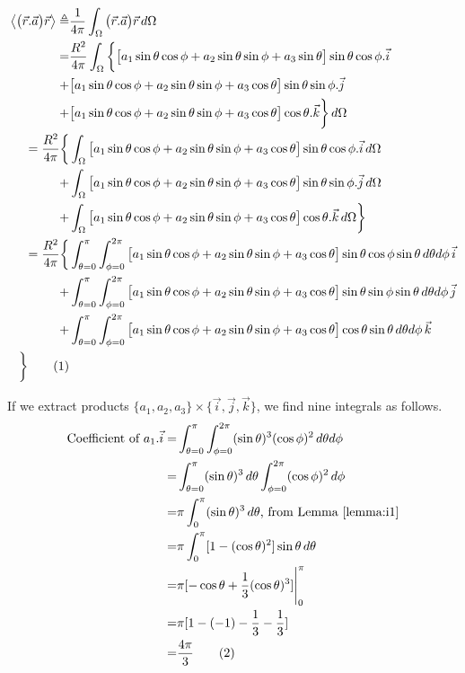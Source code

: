 \documentclass[]{article}
\newcommand\numberthis{\addtocounter{equation}{1}\tag{\theequation}}
\begin{document}
\begin{align*}
\left\langle \big(\vec{r}.\vec{a}\big)\vec{r} \right\rangle \triangleq& \frac{1}{4\pi}\int_{\Omega}\big(\vec{r}.\vec{a}\big)\vec{r} \, d\Omega \\
=&  \frac{ R^2}{4\pi}\int_{\Omega} \bigg\{ \big[a_1\sin\theta\cos\phi + a_2\sin\theta\sin\phi + a_3 \sin\theta\big] \sin\theta\cos\phi.\vec{i}\\ +& \big[a_1\sin\theta\cos\phi + a_2\sin\theta\sin\phi + a_3 \cos\theta\big]\sin\theta\sin\phi .\vec{j}\\
+& \big[a_1\sin\theta\cos\phi + a_2\sin\theta\sin\phi + a_3 \cos\theta\big] \cos\theta. \vec{k}\bigg\}\,d\Omega\\
= \frac{ R^2}{4\pi} \bigg\{&\int_{\Omega}\big[a_1\sin\theta\cos\phi + a_2\sin\theta\sin\phi + a_3 \cos\theta\big] \sin\theta\cos\phi.\vec{i}\,d\Omega\\ +& \int_{\Omega}\big[a_1\sin\theta\cos\phi + a_2\sin\theta\sin\phi + a_3 \cos\theta\big]\sin\theta\sin\phi .\vec{j}\,d\Omega\\
+& \int_{\Omega}\big[a_1\sin\theta\cos\phi + a_2\sin\theta\sin\phi + a_3 \cos\theta\big] \cos\theta. \vec{k} \, d\Omega\bigg\}\\
= \frac{ R^2}{4\pi} \bigg\{&\int_{\theta=0}^{\pi}\int_{\phi=0}^{2\pi}\big[a_1\sin\theta\cos\phi + a_2\sin\theta\sin\phi + a_3 \cos\theta\big] \sin\theta\cos\phi\sin\theta \,d\theta d\phi\,\vec{i}\\
 +& \int_{\theta=0}^{\pi}\int_{\phi=0}^{2\pi}\big[a_1\sin\theta\cos\phi + a_2\sin\theta\sin\phi + a_3 \cos\theta\big]\sin\theta\sin\phi \sin\theta \,d\theta d\phi\,\vec{j}\\
+& \int_{\theta=0}^{\pi}\int_{\phi=0}^{2\pi}\big[a_1\sin\theta\cos\phi + a_2\sin\theta\sin\phi + a_3 \cos\theta\big] \cos\theta \sin\theta \,d\theta d\phi\,\vec{k}\\ \bigg\} \numberthis \label{eq:big-int}
\end{align*}

If we extract products $\{a_1,a_2,a_3\}\times\{\vec{i},\vec{j},\vec{k}\}$, we find nine integrals as follows.
\begin{align*}
\text{Coefficient of }a_1.\vec{i} =&\int_{\theta=0}^{\pi}\int_{\phi=0}^{2\pi}(\sin\theta)^3(\cos\phi)^2\, d\theta d\phi\\
=&\int_{\theta=0}^{\pi}(\sin\theta)^3\,d\theta\int_{\phi=0}^{2\pi}(\cos\phi)^2 \, d\phi\\
=&\pi \int_{0}^{\pi}(\sin\theta)^3\,d\theta\text{, from Lemma \ref{lemma:i1}}\\
=&\pi \int_{0}^{\pi} [1-(\cos \theta)^2] \sin\theta\, d\theta  \\
=& \pi [-\cos\theta+\frac{1}{3}(\cos\theta)^3]\Bigg|_0^{\pi} \\
=& \pi [1-(-1)-\frac{1} {3}-\frac{1} {3}] \\
=& \frac{4\pi}{3}\numberthis \label{eq:a1-i}
\end{align*}
\end{document}
